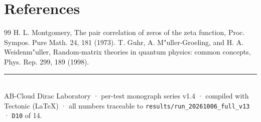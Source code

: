 \documentclass[11pt,a4paper]{article}
\begin{document}
\section*{References}
\begin{thebibliography}{99}\small
{} H. L. Montgomery, The pair correlation of zeros of the zeta function, Proc. Sympos. Pure Math. 24, 181 (1973).
 T. Guhr, A. M"uller-Groeling, and H. A. Weidenm"uller, Random-matrix theories in quantum physics: common concepts, Phys. Rep. 299, 189 (1998).
\end{thebibliography}

\vfill
\noindent\rule{\textwidth}{0.4pt}\\[0.2em]
{\footnotesize\color{labgray} AB-Cloud Dirac Laboratory · per-test monograph series v1.4 · compiled with Tectonic (LaTeX) · all numbers traceable to \texttt{results/run\_20261006\_full\_v13} · \texttt{D10} of 14.}
\end{document}
